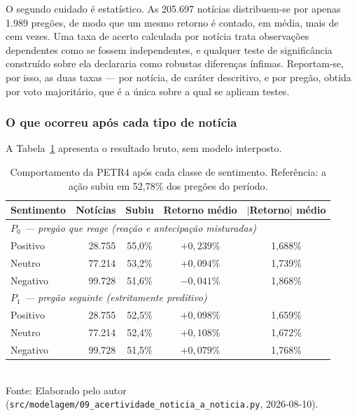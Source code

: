 O segundo cuidado é estatístico. As 205.697 notícias distribuem-se por apenas 1.989 pregões, de modo
que um mesmo retorno é contado, em média, mais de cem vezes. Uma taxa de acerto calculada por notícia
trata observações dependentes como se fossem independentes, e qualquer teste de significância
construído sobre ela declararia como robustas diferenças ínfimas. Reportam-se, por isso, as duas
taxas --- por notícia, de caráter descritivo, e por pregão, obtida por voto majoritário, que é a única
sobre a qual se aplicam testes.

\subsubsection{O que ocorreu após cada tipo de notícia}

A Tabela~\ref{tab:auditoria_matriz} apresenta o resultado bruto, sem modelo interposto.

\begin{table}[htpb]
\centering
\caption{Comportamento da PETR4 após cada classe de sentimento. Referência: a ação subiu em 52,78\% dos pregões do período.}
\label{tab:auditoria_matriz}
\begin{tabular}{l r c c c}
\hline
\textbf{Sentimento} & \textbf{Notícias} & \textbf{Subiu} & \textbf{Retorno médio} & \textbf{$|$Retorno$|$ médio} \\ \hline
\multicolumn{5}{l}{\textit{$P_0$ --- pregão que reage (reação e antecipação misturadas)}} \\
Positivo & 28.755 & 55,0\% & $+0{,}239\%$ & 1,688\% \\
Neutro   & 77.214 & 53,2\% & $+0{,}094\%$ & 1,739\% \\
Negativo & 99.728 & 51,6\% & $-0{,}041\%$ & 1,868\% \\[2pt]
\multicolumn{5}{l}{\textit{$P_1$ --- pregão seguinte (estritamente preditivo)}} \\
Positivo & 28.755 & 52,5\% & $+0{,}098\%$ & 1,659\% \\
Neutro   & 77.214 & 52,4\% & $+0{,}108\%$ & 1,672\% \\
Negativo & 99.728 & 51,5\% & $+0{,}079\%$ & 1,768\% \\
\hline
\end{tabular}
\vspace{0.2cm}
{\small \\ Fonte: Elaborado pelo autor (\texttt{src/modelagem/09\_acertividade\_noticia\_a\_noticia.py}, 2026-08-10).}
\end{table}

